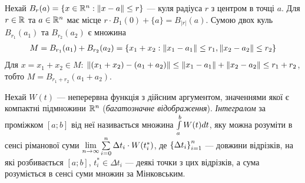 \begin{example}
    Нехай $B_{r}(a) = \left\{x \in \mathbb{R}^n : \left\Vert x - a \right\Vert \leq r \right\}$ --- куля
    радіуса $r$ з центром в точці $a$. Для
    $r \in \mathbb{R}$ та $a \in \mathbb{R}^n$ має місце
    $r\cdot B_{1}(0) + \{a\} = B_{|r|}(a)$.
    Сумою двох куль $B_{r_1}(a_1)$ та $B_{r_2}(a_2)$ є множина
    \begin{gather*}
        M = B_{r_1}(a_1) + B_{r_2}(a_2) = \left\{ 
            x_1 + x_2 : \left\Vert x_1 - a_1 \right\Vert \leq r_1, \left\Vert x_2 - a_2 \right\Vert \leq r_2    
        \right\}
    \end{gather*}
    Для $x = x_1 + x_2 \in M$: $\left\Vert (x_1 + x_2) - (a_1 + a_2) \right\Vert \leq \left\Vert x_1 - a_1 \right\Vert + \left\Vert x_2 - a_2 \right\Vert \leq r_1 + r_2$,
    тобто $M = B_{r_1 + r_2}(a_1 + a_2)$.
    \begin{center}
    \end{center}
    
\end{example}
\begin{definition}
    Нехай $W(t)$ --- неперервна функція з дійсним аргументом, значеннями якої
    є компактні підмножини $\mathbb{R}^n$ (\emph{багатозначне відображення}).
    \emph{Інтегралом} за проміжком $[a;b]$ від неї називається множина
    $\int\limits_a^b W(t) dt$, яку можна розуміти в сенсі ріманової суми
    $\underset{n\to\infty}{\lim} \sum\limits_{i=0}^n \Delta t_i\cdot W(t_i^*)$,
    де $\left\{\Delta t_i\right\}_{i=1}^n$ --- довжини відрізків, на які розбивається $[a;b]$, $t_i^* \in \Delta t_i$ ---
    деякі точки з цих відрізків, а сума розуміється в сенсі суми множин за Мінковським.
\end{definition}
